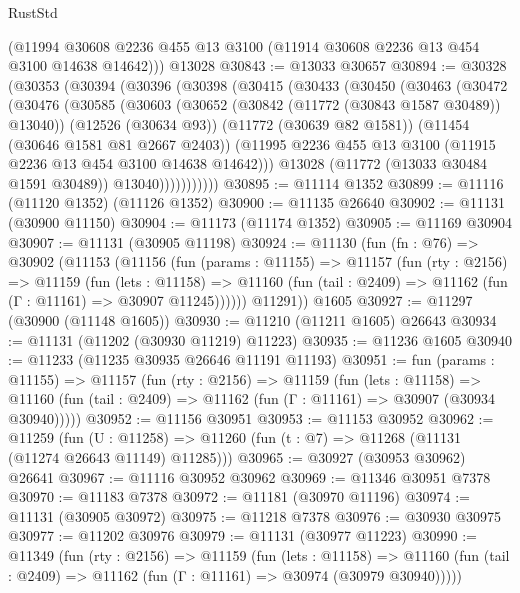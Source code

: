 \begin{lexlean}{RustStd}
\begin{coremodule}
      (@11994 @30608 @2236 @455 @13 @3100 (@11914 @30608 @2236 @13 @454 @3100 @14638 @14642)))
    @13028
@30843 := @13033 @30657
@30894 := @30328
    (@30353
      (@30394
        (@30396
          (@30398
            (@30415
              (@30433
                (@30450
                  (@30463
                    (@30472
                      (@30476
                        (@30585
                          (@30603
                            (@30652 (@30842 (@11772 (@30843 @1587 @30489)) @13040))
                            (@12526 (@30634 @93))
                            (@11772 (@30639 @82 @1581))
                            (@11454 (@30646 @1581 @81 @2667 @2403))
                            (@11995
                              @2236
                              @455
                              @13
                              @3100
                              (@11915 @2236 @13 @454 @3100 @14638 @14642)))
                          @13028
                          (@11772 (@13033 @30484 @1591 @30489))
                          @13040)))))))))))
@30895 := @11114 @1352
@30899 := @11116 (@11120 @1352) (@11126 @1352)
@30900 := @11135 @26640
@30902 := @11131 (@30900 @11150)
@30904 := @11173 (@11174 @1352)
@30905 := @11169 @30904
@30907 := @11131 (@30905 @11198)
@30924 := @11130
    (fun (fn : @76) =>
    @30902
      (@11153
        (@11156
          (fun (params : @11155) =>
          @11157
            (fun (rty : @2156) =>
            @11159
              (fun (lets : @11158) =>
              @11160 (fun (tail : @2409) => @11162 (fun (Γ : @11161) => @30907 @11245))))))
        @11291))
    @1605
@30927 := @11297 (@30900 (@11148 @1605))
@30930 := @11210 (@11211 @1605) @26643
@30934 := @11131 (@11202 (@30930 @11219) @11223)
@30935 := @11236 @1605
@30940 := @11233 (@11235 @30935 @26646 @11191 @11193)
@30951 := fun (params : @11155) =>
  @11157
    (fun (rty : @2156) =>
    @11159
      (fun (lets : @11158) =>
      @11160 (fun (tail : @2409) => @11162 (fun (Γ : @11161) => @30907 (@30934 @30940)))))
@30952 := @11156 @30951
@30953 := @11153 @30952
@30962 := @11259
    (fun (U : @11258) => @11260 (fun (t : @7) => @11268 (@11131 (@11274 @26643 @11149) @11285)))
@30965 := @30927 (@30953 @30962) @26641
@30967 := @11116 @30952 @30962
@30969 := @11346 @30951 @7378
@30970 := @11183 @7378
@30972 := @11181 (@30970 @11196)
@30974 := @11131 (@30905 @30972)
@30975 := @11218 @7378
@30976 := @30930 @30975
@30977 := @11202 @30976
@30979 := @11131 (@30977 @11223)
@30990 := @11349
    (fun (rty : @2156) =>
    @11159
      (fun (lets : @11158) =>
      @11160 (fun (tail : @2409) => @11162 (fun (Γ : @11161) => @30974 (@30979 @30940)))))

\end{coremodule}
\end{lexlean}
